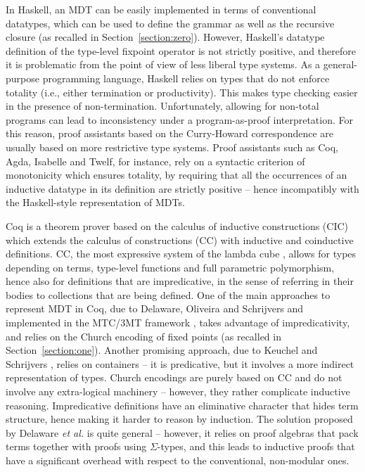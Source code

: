 \documentclass[submission,copyright,creativecommons]{eptcs}
\newcounter{prop}
\begin{document}
In Haskell, an MDT can be easily implemented in terms of conventional
datatypes, which can be used to define the grammar as well as the
recursive closure (as recalled in
Section~\ref{section:zero}). However, Haskell's datatype definition of
the type-level fixpoint operator is not strictly positive, and
therefore it is problematic from the point of view of less liberal
type systems.
As a general-purpose programming language, Haskell relies on types
that do not enforce totality (i.e., either termination or
productivity). This makes type checking easier in the presence of
non-termination. Unfortunately, allowing for non-total programs can
lead to inconsistency under a program-as-proof interpretation. For
this reason, proof assistants based on the Curry-Howard correspondence
are usually based on more restrictive type systems.
Proof assistants such as Coq, Agda, Isabelle and Twelf, for instance,
rely on a syntactic criterion of monotonicity which ensures totality,
by requiring that all the occurrences of an inductive datatype in its
definition are strictly positive -- hence incompatibly with the
Haskell-style representation of MDTs. 

Coq is a theorem prover based on the calculus of inductive
constructions (CIC) \cite{coqart} which extends the calculus of
constructions (CC) \cite{COQ} with inductive and coinductive
definitions. CC, the most expressive system of the lambda cube
\cite{Bar92}, allows for types depending on terms, type-level
functions and full parametric polymorphism, hence also for definitions
that are impredicative, in the sense of referring in their bodies to
collections that are being defined.
One of the main approaches to represent MDT in Coq, due to Delaware,
Oliveira and Schrijvers \cite{Dela13} and implemented in the MTC/3MT
framework \cite{Delaware13M}, takes advantage of impredicativity, and
relies on the Church encoding of fixed points (as recalled in
Section~\ref{section:one}). Another promising approach, due to Keuchel
and Schrijvers \cite{Keuchel13}, relies on containers -- it is
predicative, but it involves a more indirect representation of
types. Church encodings are purely based on CC and do not involve any
extra-logical machinery -- however, they rather complicate inductive
reasoning.  Impredicative definitions have an eliminative character
that hides term structure, hence making it harder to reason by
induction. The solution proposed by Delaware \emph{et al.} is quite
general -- however, it relies on proof algebras that pack terms
together with proofs using $\Sigma$-types, and this leads to inductive
proofs that have a significant overhead with respect to the
conventional, non-modular ones.
\end{document}
